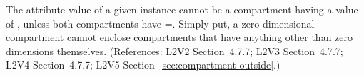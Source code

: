 The  attribute value of a given \Compartment
instance cannot be a compartment having a  value of
, unless both compartments have =.
Simply put, a zero-dimensional compartment cannot enclose compartments that
have anything other than zero dimensions themselves.  (References: L2V2
Section~4.7.7; L2V3 Section~4.7.7; L2V4 Section~4.7.7; L2V5 Section~\ref{sec:compartment-outside}.)
